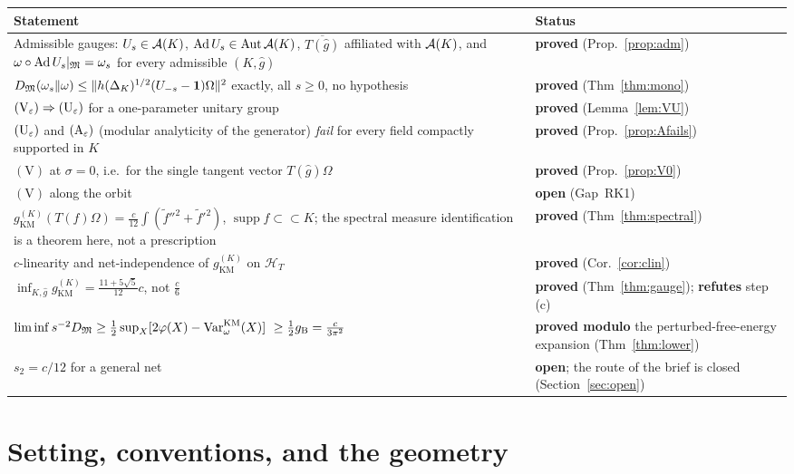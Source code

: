 \documentclass[11pt]{article}
\newcommand{\gKM}{g_{\mathrm{KM}}}\newcommand{\gB}{g_{\mathrm B}}
\newcommand{\HT}{\mathcal H_T}\newcommand{\Om}{\Omega}\newcommand{\one}{\mathbf 1}
\newcommand{\supp}{\operatorname{supp}}\newcommand{\Ad}{\operatorname{Ad}}
\begin{document}
\begin{center}\small
\begin{tabular}{@{}p{}p{}@{}}\toprule
\textbf{Statement} & \textbf{Status}\\\midrule
Admissible gauges: $U_s\in\mathcal A(K)$, $\Ad U_s\in\operatorname{Aut}\cA(K)$, $\overline{T(\hat g)}$ affiliated
 with $\mathcal A(K)$, and $\omega\circ\Ad U_s|_{\cM}=\omega_s$ for every admissible $(K,\hat g)$
 & \textbf{proved} (Prop.~\ref{prop:adm})\\
$D_{\cM}(\omega_s\Vert\omega)\le\norm{h(\Delta_K)^{1/2}(U_{-s}-\one)\Om}^2$ exactly, all $s\ge0$, no hypothesis
 & \textbf{proved} (Thm~\ref{thm:mono})\\
$(\mathrm V_\varepsilon)\Rightarrow(\mathrm U_\varepsilon)$ for a one-parameter unitary group
 & \textbf{proved} (Lemma~\ref{lem:VU})\\
$(\mathrm U_\varepsilon)$ and $(\mathrm A_\varepsilon)$ (modular analyticity of the generator) \emph{fail} for every field compactly supported
 in $K$ & \textbf{proved} (Prop.~\ref{prop:Afails})\\
$(\mathrm V)$ at $\sigma=0$, i.e.\ for the single tangent vector $T(\hat g)\Om$
 & \textbf{proved} (Prop.~\ref{prop:V0})\\
$(\mathrm V)$ along the orbit & \textbf{open} (Gap~RK1)\\
$\gKM^{(K)}(T(f)\Om)=\frac c{12}\int(\tilde f''^2+\tilde f'^2)$, $\supp f\subset\subset K$; the spectral measure
 identification is a theorem here, not a prescription & \textbf{proved} (Thm~\ref{thm:spectral})\\
$c$-linearity and net-independence of $\gKM^{(K)}$ on $\HT$ & \textbf{proved} (Cor.~\ref{cor:clin})\\
$\inf_{K,\hat g}\gKM^{(K)}=\frac{11+5\sqrt5}{12}c$, not $\frac c6$ & \textbf{proved}
 (Thm~\ref{thm:gauge}); \textbf{refutes} step (c)\\
$\liminf s^{-2}D_{\cM}\ge\frac12\sup_{X}[2\varphi(X)-\Var^{\mathrm{KM}}_\omega(X)]\ \ge\frac12\gB=\frac c{3\pi^2}$
 & \textbf{proved modulo} the perturbed-free-energy expansion (Thm~\ref{thm:lower})\\
$s_2=c/12$ for a general net & \textbf{open}; the route of the brief is closed
 (Section~\ref{sec:open})\\\bottomrule
\end{tabular}
\end{center}

\section{Setting, conventions, and the geometry}\label{sec:setting}
\end{document}

